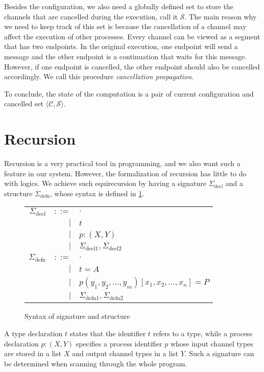\documentclass[12pt, openany]{memoir}
\newcommand*{\config}[0]{\mathcal{C}}
\newcommand*{\cancelSet}[0]{\mathcal{S}}
\begin{document}
Besides the configuration, we also need a globally defined set to store the channels that are cancelled during the execution, call it $\cancelSet$.
The main reason why we need to keep track of this set is because the cancellation of a channel may affect the execution of other processes.
Every channel can be viewed as a segment that has two endpoints. In the original execution, one endpoint will send a message and the other endpoint is a continuation that waits for this message.
However, if one endpoint is cancelled, the other endpoint should also be cancelled accordingly. 
We call this procedure \textit{cancellation propagation}.

To conclude, the state of the computation is a pair of current configuration and cancelled set $\langle \config, \cancelSet \rangle$.
\section{Recursion}
Recursion is a very practical tool in programming, 
and we also want such a feature in our system. However, the formalization of recursion has little to do with logics. 
We achieve such equirecursion by having a signature $\Sigma_{\text{decl}}$ and a structure $\Sigma_{\text{defn}}$, 
whose syntax is defined in \cref{fig:syntaxsig}.
\begin{figure}[H]
  \centering
  \begin{tabular}{r r l}
    $\Sigma_{\text{decl}}$ & $::=$ & $\cdot$ \\
    & $\mid$ & $t$ \\
    & $\mid$ & $p : (X, Y)$ \\
    & $\mid$ & $\Sigma_{\text{decl}1}, \Sigma_{\text{decl}2}$ \\  
    $\Sigma_{\text{defn}}$ & $::=$ & $\cdot$ \\
    & $\mid$ & $t = A$ \\
    & $\mid$ & $p (y_1, y_2, \ldots, y_m)[x_1, x_2, \ldots, x_n]= P$ \\
    & $\mid$ & $\Sigma_{\text{defn}1}, \Sigma_{\text{defn}2}$
    \end{tabular}
  \caption{Syntax of signature and structure}
  \label{fig:syntaxsig}
\end{figure}
A type declaration $t$ states that the identifier $t$ refers to a type, while
a process declaration $p : (X, Y)$ specifies a process identifier $p$ whose input channel types are stored in a list $X$
and output channel types in a list $Y$. 
Such a signature can be determined when scanning through the whole program. 
\end{document}
